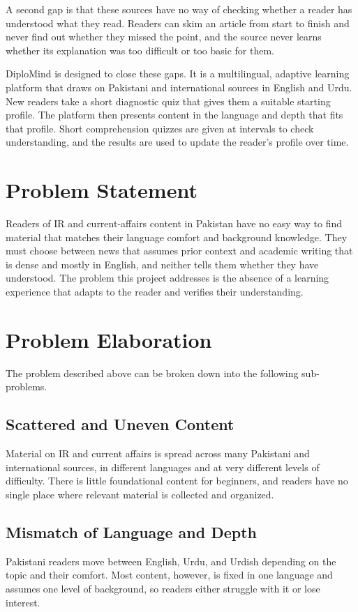 \documentclass{FastFyp}
\begin{document}
A second gap is that these sources have no way of checking whether a reader has understood what they read. Readers can skim an article from start to finish and never find out whether they missed the point, and the source never learns whether its explanation was too difficult or too basic for them.

DiploMind is designed to close these gaps. It is a multilingual, adaptive learning platform that draws on Pakistani and international sources in English and Urdu. New readers take a short diagnostic quiz that gives them a suitable starting profile. The platform then presents content in the language and depth that fits that profile. Short comprehension quizzes are given at intervals to check understanding, and the results are used to update the reader’s profile over time.


\section{Problem Statement}
Readers of IR and current-affairs content in Pakistan have no easy way to find material that matches their language comfort and background knowledge. They must choose between news that assumes prior context and academic writing that is dense and mostly in English, and neither tells them whether they have understood. The problem this project addresses is the absence of a learning experience that adapts to the reader and verifies their understanding.


\section{Problem Elaboration}
The problem described above can be broken down into the following sub-problems.

\subsection{Scattered and Uneven Content}
Material on IR and current affairs is spread across many Pakistani and international sources, in different languages and at very different levels of difficulty. There is little foundational content for beginners, and readers have no single place where relevant material is collected and organized.

\subsection{Mismatch of Language and Depth}
Pakistani readers move between English, Urdu, and Urdish depending on the topic and their comfort. Most content, however, is fixed in one language and assumes one level of background, so readers either struggle with it or lose interest.
\end{document}
